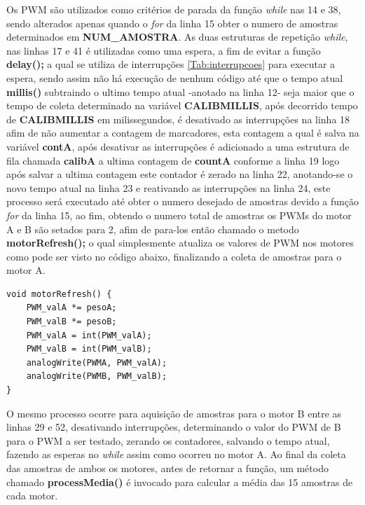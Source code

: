 \documentclass[a4paper,12pt,portuguese]{ufms-cpcx}
\begin{document}
Os PWM são utilizados como critérios de parada da função \textit{while} nas 14 e 38, sendo alterados apenas quando o \textit{for} da linha 15 obter o numero de amostras determinados em \textbf{NUM\_AMOSTRA}.
As duas estruturas de repetição \textit{while}, nas linhas 17 e 41 é utilizadas como uma espera, a fim de evitar a função \textbf{delay();} a qual se utiliza de interrupções \ref{Tab:interrupcoes} para executar a espera, sendo assim não há execução de nenhum código até que o tempo atual \textbf{millis()} subtraindo o ultimo tempo atual -anotado na linha 12- seja maior que o tempo de coleta determinado na variável \textbf{CALIBMILLIS}, após decorrido tempo de \textbf{CALIBMILLIS} em milissegundos, é desativado as interrupções na linha 18 afim de não aumentar a contagem de marcadores, esta contagem a qual é salva na variável \textbf{contA}, após desativar as interrupções é adicionado a uma estrutura de fila chamada \textbf{calibA} a ultima contagem de \textbf{countA} conforme a linha 19 logo após salvar a ultima contagem este contador é zerado na linha 22, anotando-se o novo tempo atual na linha 23 e reativando as interrupções na linha 24, este processo será executado até obter o numero desejado de amostras devido a função \textit{for} da linha 15, ao fim, obtendo o numero total de amostras os PWMs do motor A e B são setados para 2, afim de para-los então chamado o metodo \textbf{motorRefresh();} o qual simplesmente atualiza os valores de PWM nos motores como pode ser visto no código abaixo, finalizando a coleta de amostras para o motor A.
\begin{lstlisting}
void motorRefresh() {
	PWM_valA *= pesoA;
	PWM_valB *= pesoB;
	PWM_valA = int(PWM_valA);
	PWM_valB = int(PWM_valB);
	analogWrite(PWMA, PWM_valA);
	analogWrite(PWMB, PWM_valB);
}
\end{lstlisting}
O mesmo processo ocorre para aquisição de amostras para o motor B entre as linhas 29 e 52, desativando interrupções, determinando o valor do PWM de B para o PWM a ser testado, zerando os contadores, salvando o tempo atual, fazendo as esperas no \textit{while} assim como ocorreu no motor A.
Ao final da coleta das amostras de ambos os motores, antes de retornar a função, um método chamado \textbf{processMedia()} é invocado para calcular a média das 15 amostras de cada motor.
\end{document}
